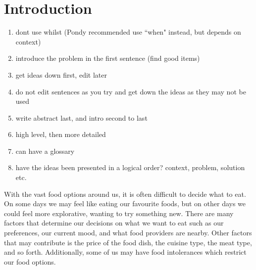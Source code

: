 \chapter{Introduction}\label{C:intro}

\begin{enumerate}
 \item dont use whilst (Pondy recommended use ``when" instead, but depends on context)
 \item introduce the problem in the first sentence (find good items)
 \item get ideas down first, edit later
 \item do not edit sentences as you try and get down the ideas as they may not be used
 \item write abstract last, and intro second to last
 \item high level, then more detailed 
 \item can have a glossary
 \item have the ideas been presented in a logical order? context, problem, solution etc.
\end{enumerate}

With the vast food options around us, it is often difficult to decide what to eat. On some days we may feel like eating our favourite foods, but on other days we could feel more explorative, wanting to try something new. There are many factors that determine our decisions on what we want to eat such as our preferences, our current mood, and what food providers are nearby. Other factors that may contribute is the price of the food dish, the cuisine type, the meat type, and so forth. Additionally, some of us may have food intolerances which restrict our food options.

